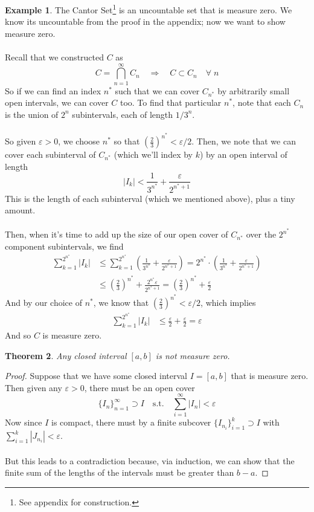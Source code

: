 \documentclass[12pt]{article}
\theoremstyle{plain}
\newtheorem{thm}{Theorem}[subsection]
\theoremstyle{definition}
\newtheorem{ex}[thm]{Example}
\theoremstyle{remark}
\begin{document}
\begin{ex}
The Cantor Set\footnote{See appendix for construction.} is an uncountable set that is measure zero. We know its uncountable from the proof in the appendix; now we want to show measure zero.
\\
\\
Recall that we constructed $C$ as 
\[
    C = \bigcap^\infty_{n=1} C_n \quad\Rightarrow\quad
    C \subset C_n \quad \forall\;n
\]
So if we can find an index $n^*$ such that we can cover $C_{n^*}$ by arbitrarily small open intervals, we can cover $C$ too.  To find that particular $n^*$, note that each $C_n$ is the union of $2^n$ subintervals, each of length $1/3^n$. 
\\
\\
So given $\varepsilon>0$, we choose $n^*$ so that $\left(\frac{2}{3}\right)^{n^*} < \varepsilon/2$. Then, we note that we can cover each subinterval of $C_{n^*}$ (which we'll index by $k$) by an open interval of length 
\[ 
    |I_k| < \frac{1}{3^{n^*}} + \frac{\varepsilon}{2^{{n^*}+1}} 
\] 
This is the length of each subinterval (which we mentioned above), plus a tiny amount.
\\
\\
Then, when it's time to add up the size of our open cover of $C_{n^*}$ over the $2^{n^*}$ component subintervals, we find
\begin{align*}
    \sum^{2^{n^*}}_{k=1} |I_k| &\leq \sum^{2^{n^*}}_{k=1}
    \left(\frac{1}{3^{n^*}} + \frac{\varepsilon}{2^{{n^*}+1}}\right)
    = 2^{n^*} \cdot 
    \left(\frac{1}{3^{n^*}} + \frac{\varepsilon}{2^{{n^*}+1}}\right)
    \\
    &\leq \left(\frac{2}{3}\right)^{n^*} + 
        \frac{2^{n^*}\varepsilon}{2^{{n^*}+1}}
    = \left(\frac{2}{3}\right)^{n^*} + 
        \frac{\varepsilon}{2}
\end{align*}
And by our choice of $n^*$, we know that $\left(\frac{2}{3}\right)^{n^*} < \varepsilon/2$, which implies
\begin{align*}
    \sum^{2^{n^*}}_{k=1} |I_k| &\leq 
    \frac{\varepsilon}{2} +
    \frac{\varepsilon}{2}
    = \varepsilon
\end{align*}
And so $C$ is measure zero.
\end{ex}

\begin{thm}
Any closed interval $[a,b]$ is not measure zero.
\end{thm}
\begin{proof}
    Suppose that we have some closed interval $I = [a,b]$ that is measure zero. Then given any $\varepsilon>0$, there must be an open cover 
\[  
    \{I_n\}_{n=1}^\infty \supset I 
    \quad \text{s.t.} \quad
    \sum^\infty_{i=1} |I_n|<\varepsilon
\]
Now since $I$ is compact, there must by a finite subcover $\{I_{n_i}\}^k_{i=1} \supset I$ with $\sum^k_{i=1} |J_{n_i}| <\varepsilon$.
\\
\\
But this leads to a contradiction because, via induction, we can show that the finite sum of the lengths of the intervals must be greater than $b-a$.
\end{proof}
\end{document}
